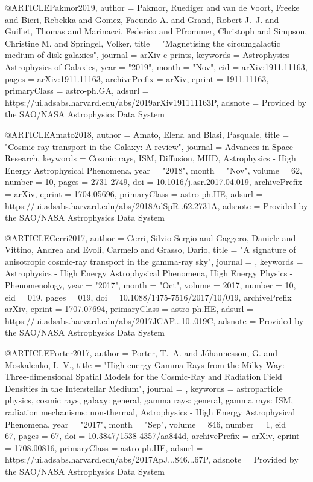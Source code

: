 \documentclass[useAMS,usenatbib]{mnras}
\begin{document}
@ARTICLE{Pakmor2019,
       author = {{Pakmor}, Ruediger and {van de Voort}, Freeke and {Bieri}, Rebekka and
         {Gomez}, Facundo A. and {Grand}, Robert J.~J. and {Guillet}, Thomas and
         {Marinacci}, Federico and {Pfrommer}, Christoph and
         {Simpson}, Christine M. and {Springel}, Volker},
        title = "{Magnetising the circumgalactic medium of disk galaxies}",
      journal = {arXiv e-prints},
     keywords = {Astrophysics - Astrophysics of Galaxies},
         year = "2019",
        month = "Nov",
          eid = {arXiv:1911.11163},
        pages = {arXiv:1911.11163},
archivePrefix = {arXiv},
       eprint = {1911.11163},
 primaryClass = {astro-ph.GA},
       adsurl = {https://ui.adsabs.harvard.edu/abs/2019arXiv191111163P},
      adsnote = {Provided by the SAO/NASA Astrophysics Data System}
}

@ARTICLE{Amato2018,
       author = {{Amato}, Elena and {Blasi}, Pasquale},
        title = "{Cosmic ray transport in the Galaxy: A review}",
      journal = {Advances in Space Research},
     keywords = {Cosmic rays, ISM, Diffusion, MHD, Astrophysics - High Energy Astrophysical Phenomena},
         year = "2018",
        month = "Nov",
       volume = {62},
       number = {10},
        pages = {2731-2749},
          doi = {10.1016/j.asr.2017.04.019},
archivePrefix = {arXiv},
       eprint = {1704.05696},
 primaryClass = {astro-ph.HE},
       adsurl = {https://ui.adsabs.harvard.edu/abs/2018AdSpR..62.2731A},
      adsnote = {Provided by the SAO/NASA Astrophysics Data System}
}

@ARTICLE{Cerri2017,
       author = {{Cerri}, Silvio Sergio and {Gaggero}, Daniele and {Vittino}, Andrea and
         {Evoli}, Carmelo and {Grasso}, Dario},
        title = "{A signature of anisotropic cosmic-ray transport in the gamma-ray sky}",
      journal = {\jcap},
     keywords = {Astrophysics - High Energy Astrophysical Phenomena, High Energy Physics - Phenomenology},
         year = "2017",
        month = "Oct",
       volume = {2017},
       number = {10},
          eid = {019},
        pages = {019},
          doi = {10.1088/1475-7516/2017/10/019},
archivePrefix = {arXiv},
       eprint = {1707.07694},
 primaryClass = {astro-ph.HE},
       adsurl = {https://ui.adsabs.harvard.edu/abs/2017JCAP...10..019C},
      adsnote = {Provided by the SAO/NASA Astrophysics Data System}
}

@ARTICLE{Porter2017,
       author = {{Porter}, T.~A. and {J{\'o}hannesson}, G. and {Moskalenko}, I.~V.},
        title = "{High-energy Gamma Rays from the Milky Way: Three-dimensional Spatial Models for the Cosmic-Ray and Radiation Field Densities in the Interstellar Medium}",
      journal = {\apj},
     keywords = {astroparticle physics, cosmic rays, galaxy: general, gamma rays: general, gamma rays: ISM, radiation mechanisms: non-thermal, Astrophysics - High Energy Astrophysical Phenomena},
         year = "2017",
        month = "Sep",
       volume = {846},
       number = {1},
          eid = {67},
        pages = {67},
          doi = {10.3847/1538-4357/aa844d},
archivePrefix = {arXiv},
       eprint = {1708.00816},
 primaryClass = {astro-ph.HE},
       adsurl = {https://ui.adsabs.harvard.edu/abs/2017ApJ...846...67P},
      adsnote = {Provided by the SAO/NASA Astrophysics Data System}
}
\end{document}
